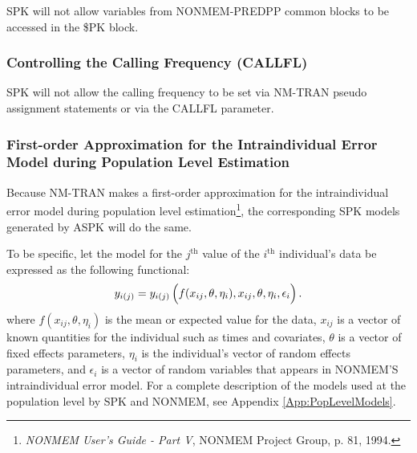 \documentclass{article}
\begin{document}
SPK will not allow variables from NONMEM-PREDPP common blocks to be
accessed in the \$PK block.


\subsubsection{Controlling the Calling Frequency (CALLFL)}

SPK will not allow the calling frequency to be set via NM-TRAN
pseudo assignment statements or via the CALLFL parameter.


\subsubsection{First-order Approximation for the Intraindividual Error Model
  during Population Level Estimation}

Because NM-TRAN makes a first-order approximation for the 
intraindividual error model during population level 
estimation\footnote{
  {\em NONMEM User's Guide - Part V}, NONMEM Project Group, 
  p. 81, 1994.
},
the corresponding SPK models generated by ASPK will do the same.

To be specific, let the model for 
the $j^{\mbox{th}}$ value of the $i^{\mbox{th}}$ individual's data
be expressed as the following functional:
  \begin{equation}
    y_{i(j)} = y_{i(j)}\left( \rule{0.0in}{0.15in}
      f(x_{ij}, \theta, \eta_i), x_{ij}, \theta, \eta_i, \epsilon_i \right) .
  \end{equation}
where $f(x_{ij}, \theta, \eta_i)$ is the mean or expected value 
for the data,
$x_{ij}$ is a vector of known quantities for the individual
such as times and covariates,
$\theta$ is a vector of fixed effects parameters,
$\eta_i$ is the individual's vector of random effects parameters,
and $\epsilon_i$ is a vector of random variables that appears in
NONMEM'S intraindividual error model.
For a complete description of the models used at the population 
level by SPK and NONMEM, see Appendix \ref{App:PopLevelModels}.
\end{document}
